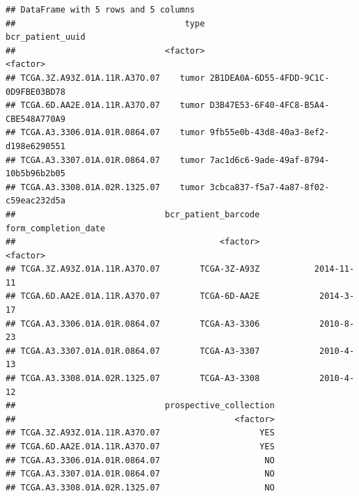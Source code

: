 \documentclass[]{article}
\begin{document}
\begin{verbatim}
## DataFrame with 5 rows and 5 columns
##                                  type                     bcr_patient_uuid
##                              <factor>                             <factor>
## TCGA.3Z.A93Z.01A.11R.A37O.07    tumor 2B1DEA0A-6D55-4FDD-9C1C-0D9FBE03BD78
## TCGA.6D.AA2E.01A.11R.A37O.07    tumor D3B47E53-6F40-4FC8-B5A4-CBE548A770A9
## TCGA.A3.3306.01A.01R.0864.07    tumor 9fb55e0b-43d8-40a3-8ef2-d198e6290551
## TCGA.A3.3307.01A.01R.0864.07    tumor 7ac1d6c6-9ade-49af-8794-10b5b96b2b05
## TCGA.A3.3308.01A.02R.1325.07    tumor 3cbca837-f5a7-4a87-8f02-c59eac232d5a
##                              bcr_patient_barcode form_completion_date
##                                         <factor>             <factor>
## TCGA.3Z.A93Z.01A.11R.A37O.07        TCGA-3Z-A93Z           2014-11-11
## TCGA.6D.AA2E.01A.11R.A37O.07        TCGA-6D-AA2E            2014-3-17
## TCGA.A3.3306.01A.01R.0864.07        TCGA-A3-3306            2010-8-23
## TCGA.A3.3307.01A.01R.0864.07        TCGA-A3-3307            2010-4-13
## TCGA.A3.3308.01A.02R.1325.07        TCGA-A3-3308            2010-4-12
##                              prospective_collection
##                                            <factor>
## TCGA.3Z.A93Z.01A.11R.A37O.07                    YES
## TCGA.6D.AA2E.01A.11R.A37O.07                    YES
## TCGA.A3.3306.01A.01R.0864.07                     NO
## TCGA.A3.3307.01A.01R.0864.07                     NO
## TCGA.A3.3308.01A.02R.1325.07                     NO
\end{verbatim}
\end{document}
